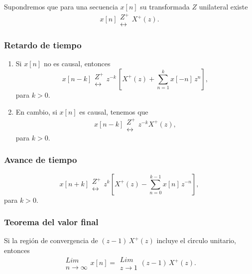 Supondremos que para una secuencia $x[n]$ su transformada $Z$ unilateral existe
\begin{equation}
  x[n] \begin{array}{c} Z^{+} \\ \leftrightarrow \end{array} X^{+}(z).
\end{equation}

\subsubsection{Retardo de tiempo}

\begin{enumerate}

\item Si $x[n]$ no es causal, entonces
\begin{equation}
  x[n-k] 
     \begin{array}{c} Z^{+} \\ \leftrightarrow \end{array} 
  z^{-k} \, \left[ X^{+}(z) + \sum_{n=1}^{k} x[-n] \, z^{n} \right],
\end{equation}
para $k > 0$.

\item En cambio, si $x[n]$ es causal, tenemos que
\begin{equation}
  x[n-k] 
     \begin{array}{c} Z^{+} \\ \leftrightarrow \end{array} 
  z^{-k} X^{+}(z),
\end{equation}
para $k > 0$.

\end{enumerate}

\subsubsection{Avance de tiempo}

\begin{equation}
  x[n+k] 
     \begin{array}{c} Z^{+} \\ \leftrightarrow \end{array} 
  z^{k} \left[ X^{+}(z) - \sum_{n=0}^{k-1} x[n] \, z^{-n} \right],
\end{equation}
para $k > 0$.

\subsubsection{Teorema del valor final}

Si la regi\'{o}n de convergencia de $(z-1) \, X^{+}(z)$ incluye el c\'{\i}rculo unitario, entonces
\begin{equation}
  \begin{array}{c}
     Lim \\
     n \rightarrow \infty
  \end{array}
  x[n] = 
  \begin{array}{c}
     Lim \\
     z \rightarrow 1
  \end{array}
  (z - 1) \, X^{+}(z).
\end{equation}
